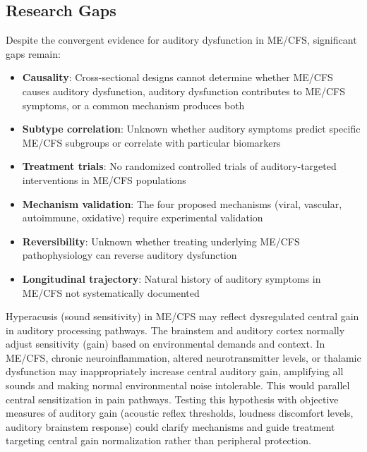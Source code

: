 \subsection{Research Gaps}

Despite the convergent evidence for auditory dysfunction in ME/CFS, significant gaps remain:

\begin{itemize}
    \item \textbf{Causality}: Cross-sectional designs cannot determine whether ME/CFS causes auditory dysfunction, auditory dysfunction contributes to ME/CFS symptoms, or a common mechanism produces both
    \item \textbf{Subtype correlation}: Unknown whether auditory symptoms predict specific ME/CFS subgroups or correlate with particular biomarkers
    \item \textbf{Treatment trials}: No randomized controlled trials of auditory-targeted interventions in ME/CFS populations
    \item \textbf{Mechanism validation}: The four proposed mechanisms (viral, vascular, autoimmune, oxidative) require experimental validation
    \item \textbf{Reversibility}: Unknown whether treating underlying ME/CFS pathophysiology can reverse auditory dysfunction
    \item \textbf{Longitudinal trajectory}: Natural history of auditory symptoms in ME/CFS not systematically documented
\end{itemize}

\begin{open_question}
Hyperacusis (sound sensitivity) in ME/CFS may reflect dysregulated central gain in auditory processing pathways. The brainstem and auditory cortex normally adjust sensitivity (gain) based on environmental demands and context. In ME/CFS, chronic neuroinflammation, altered neurotransmitter levels, or thalamic dysfunction may inappropriately increase central auditory gain, amplifying all sounds and making normal environmental noise intolerable. This would parallel central sensitization in pain pathways. Testing this hypothesis with objective measures of auditory gain (acoustic reflex thresholds, loudness discomfort levels, auditory brainstem response) could clarify mechanisms and guide treatment targeting central gain normalization rather than peripheral protection.
\end{open_question}

